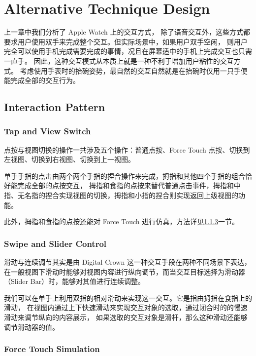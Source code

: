 \chapter{Alternative Technique Design}

\quad\quad 上一章中我们分析了 Apple Watch 上的交互方式，
除了语音交互外，这些方式都要求用户使用双手来完成整个交互。但实际场景中，如果用户双手空闲，
则用户完全可以使用手机完成需要完成的事情，况且在屏幕适中的手机上完成交互也只需一直手。
因此，这种交互模式从本质上就是一种不利于增加用户粘性的交互方式。
考虑使用手表时的抬碗姿势，最自然的交互自然就是在抬碗时仅用一只手便能完成全部的交互行为。

\section{Interaction Pattern}

\subsection{Tap and View Switch}

点按与视图切换的操作一共涉及五个操作：普通点按、Force Touch 点按、切换到左视图、切换到右视图、切换到上一视图。

单手手指的点击由两个两个手指的捏合操作来完成，拇指和其他四个手指的组合恰好能完成全部的点按交互，
拇指和食指的点按来替代普通点击事件，拇指和中指、无名指的捏合实现视图的切换，拇指和小指的捏合则实现返回上级视图的功能。

此外，拇指和食指的点按还能对 Force Touch 进行仿真，方法详见\ref{sub:force-touch-simu}一节。

\subsection{Swipe and Slider Control}

滑动与连续调节其实是由 Digital Crown 这一种交互手段在两种不同场景下表达，
在一般视图下滑动时能够对视图内容进行纵向调节，而当交互目标选择为滑动器（Slider Bar）时，能够对其值进行连续调整。

我们可以在单手上利用双指的相对滑动来实现这一交互。它是指由拇指在食指上的滑动，
在视图内通过上下快速滑动来实现交互对象的选取，通过闭合时的的慢速滑动来调节纵向的内容展示，
如果选取的交互对象是滑杆，那么这种滑动还能够调节滑动器的值。

\subsection{Force Touch Simulation}
\label{sub:force-touch-simu}

